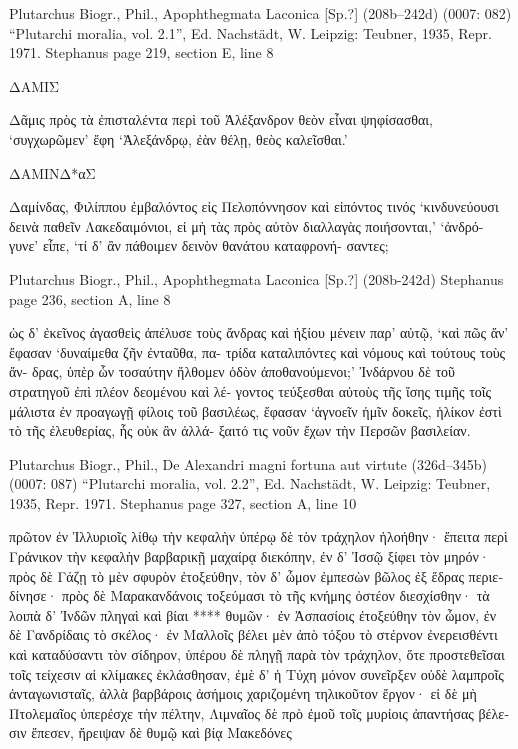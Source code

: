 \documentclass[12pt,letterpaper,twoside,final]{memoir}
\begin{document}
\begin{greek}
Plutarchus Biogr., Phil., Apophthegmata Laconica [Sp.?] (208b–242d) (0007: 082)
“Plutarchi moralia, vol. 2.1”, Ed. Nachstädt, W.
Leipzig: Teubner, 1935, Repr. 1971.
Stephanus page 219, section E, line 8

           
ΔΑΜΙΣ


 Δᾶμις πρὸς τὰ ἐπισταλέντα περὶ τοῦ Ἀλέξανδρον θεὸν 
εἶναι ψηφίσασθαι, ‘συγχωρῶμεν’ ἔφη ‘Ἀλεξάνδρῳ, ἐὰν 
θέλῃ, θεὸς καλεῖσθαι.’   
          
ΔΑΜΙΝΔ*αΣ


 Δαμίνδας, Φιλίππου ἐμβαλόντος εἰς Πελοπόννησον καὶ 
εἰπόντος τινός ‘κινδυνεύουσι δεινὰ παθεῖν Λακεδαιμόνιοι, 
εἰ μὴ τὰς πρὸς αὐτὸν διαλλαγὰς ποιήσονται,’ ‘ἀνδρό-
γυνε’ εἶπε, ‘τί δ' ἂν πάθοιμεν δεινὸν θανάτου καταφρονή-
σαντες; 



Plutarchus Biogr., Phil., Apophthegmata Laconica [Sp.?] (208b-242d) 
Stephanus page 236, section A, line 8

                                               ὡς δ' ἐκεῖνος 
ἀγασθεὶς ἀπέλυσε τοὺς ἄνδρας καὶ ἠξίου μένειν παρ' 
αὐτῷ, ‘καὶ πῶς ἄν’ ἔφασαν ‘δυναίμεθα ζῆν ἐνταῦθα, πα-
τρίδα καταλιπόντες καὶ νόμους καὶ τούτους τοὺς ἄν-
δρας, ὑπὲρ ὧν τοσαύτην ἤλθομεν ὁδὸν ἀποθανούμενοι;’ 
Ἰνδάρνου δὲ τοῦ στρατηγοῦ ἐπὶ πλέον δεομένου καὶ λέ-
γοντος τεύξεσθαι αὐτοὺς τῆς ἴσης τιμῆς τοῖς μάλιστα ἐν 
προαγωγῇ φίλοις τοῦ βασιλέως, ἔφασαν ‘ἀγνοεῖν ἡμῖν 
δοκεῖς, ἡλίκον ἐστὶ τὸ τῆς ἐλευθερίας, ἧς οὐκ ἂν ἀλλά-
ξαιτό τις νοῦν ἔχων τὴν Περσῶν βασιλείαν. 



Plutarchus Biogr., Phil., De Alexandri magni fortuna aut virtute (326d–345b) (0007: 087)
“Plutarchi moralia, vol. 2.2”, Ed. Nachstädt, W.
Leipzig: Teubner, 1935, Repr. 1971.
Stephanus page 327, section A, line 10

                                            πρῶτον ἐν   
Ἰλλυριοῖς λίθῳ τὴν κεφαλὴν ὑπέρῳ δὲ τὸν τράχηλον 
ἠλοήθην· ἔπειτα περὶ Γράνικον τὴν κεφαλὴν βαρβαρικῇ 
μαχαίρᾳ διεκόπην, ἐν δ' Ἰσσῷ ξίφει τὸν μηρόν· πρὸς 
δὲ Γάζῃ τὸ μὲν σφυρὸν ἐτοξεύθην, τὸν δ' ὦμον ἐμπεσὼν 
βῶλος ἐξ ἕδρας περιεδίνησε· πρὸς δὲ Μαρακανδάνοις 
τοξεύμασι τὸ τῆς κνήμης ὀστέον διεσχίσθην· τὰ λοιπὰ 
δ' Ἰνδῶν πληγαὶ καὶ βίαι **** θυμῶν· ἐν Ἀσπασίοις 
ἐτοξεύθην τὸν ὦμον, ἐν δὲ Γανδρίδαις τὸ σκέλος· ἐν 
Μαλλοῖς βέλει μὲν ἀπὸ τόξου τὸ στέρνον ἐνερεισθέντι 
καὶ καταδύσαντι τὸν σίδηρον, ὑπέρου δὲ πληγῇ παρὰ τὸν 
τράχηλον, ὅτε προστεθεῖσαι τοῖς τείχεσιν αἱ κλίμακες 
ἐκλάσθησαν, ἐμὲ δ' ἡ Τύχη μόνον συνεῖρξεν οὐδὲ λαμπροῖς 
ἀνταγωνισταῖς, ἀλλὰ βαρβάροις ἀσήμοις χαριζομένη 
τηλικοῦτον ἔργον· εἰ δὲ μὴ Πτολεμαῖος ὑπερέσχε τὴν 
πέλτην, Λιμναῖος δὲ πρὸ ἐμοῦ τοῖς μυρίοις ἀπαντήσας   
βέλεσιν ἔπεσεν, ἤρειψαν δὲ θυμῷ καὶ βίᾳ Μακεδόνες 





\end{greek}
\end{document}
